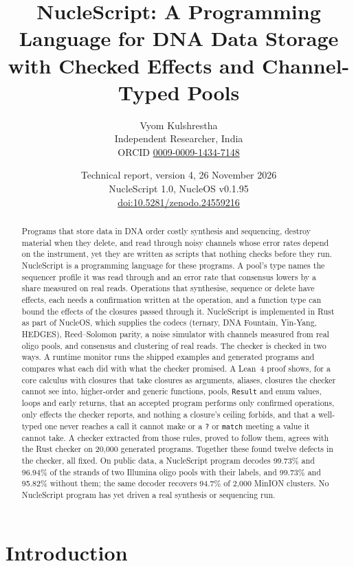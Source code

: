 \documentclass[11pt,a4paper]{article}
\title{NucleScript: A Programming Language for DNA Data Storage\\
with Checked Effects and Channel-Typed Pools}
\author{Vyom Kulshrestha\\
\small Independent Researcher, India\\
\small ORCID \href{https://orcid.org/0009-0009-1434-7148}{0009-0009-1434-7148}}
\date{Technical report, version 4, 26 November 2026\\
\small NucleScript 1.0, NucleOS v0.1.95\\
\small \href{https://doi.org/10.5281/zenodo.24559216}{doi:10.5281/zenodo.24559216}}
\newcommand{\nsl}[1]{\texttt{#1}}
\begin{document}
\maketitle

\begin{abstract}
Programs that store data in DNA order costly synthesis and sequencing,
destroy material when they delete, and read through noisy channels whose
error rates depend on the instrument, yet they are written as scripts
that nothing checks before they run. NucleScript is a programming
language for these programs. A pool's type names the
sequencer profile it was read through and an error rate that consensus
lowers by a share measured on real reads. Operations that synthesise, sequence or delete have effects, each
needs a confirmation written at the operation, and a function type can
bound the effects of the closures passed through it. NucleScript is
implemented in Rust as part of NucleOS, which supplies the codecs
(ternary, DNA Fountain, Yin-Yang, HEDGES), Reed--Solomon parity, a noise
simulator with channels measured from real oligo pools, and consensus and
clustering of real reads. The checker is checked in two ways. A runtime
monitor runs the shipped examples and generated programs and compares
what each did with what the checker promised. A Lean~4
proof shows, for a core calculus with closures that take closures as
arguments, aliases, closures the checker cannot see into, higher-order
and generic functions, pools, \nsl{Result} and enum values, loops and
early returns, that an accepted program performs only confirmed
operations, only effects the checker reports, and nothing a closure's
ceiling forbids, and that a well-typed one never reaches a call it cannot
make or a \nsl{?} or \nsl{match} meeting a value it cannot take. A checker
extracted from those rules, proved to follow them, agrees with the Rust
checker on 20,000 generated programs. Together these found twelve
defects in the checker, all fixed. On public data, a
NucleScript program decodes 99.73\% and 96.94\% of the strands of two
Illumina oligo pools with their labels, and 99.73\% and 95.82\% without
them; the same decoder recovers 94.7\% of 2,000 MinION clusters. No
NucleScript program has yet driven a real synthesis or sequencing run.
\end{abstract}

\section{Introduction}
\end{document}
